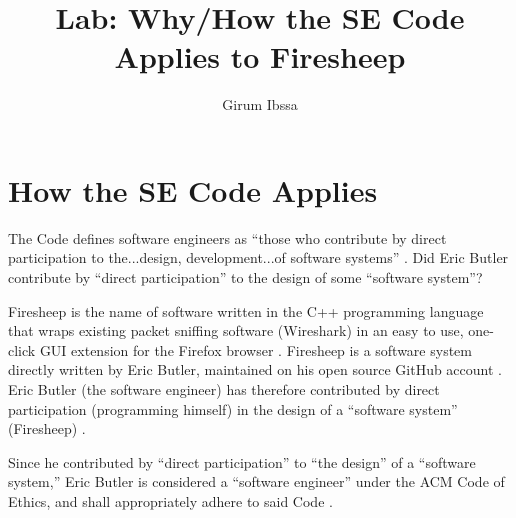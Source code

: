\documentclass[11pt]{article}
\begin{document}
\twocolumn
\author{Girum Ibssa}
\title{Lab: Why/How the SE Code Applies to Firesheep}
\maketitle


\section{How the SE Code Applies}
The Code defines software engineers as ``those who contribute by direct participation to the...design, development...of software systems'' \cite{se-code}. Did Eric Butler contribute by ``direct participation'' to the design of some ``software system''?

Firesheep is the name of software written in the C++ programming language that wraps existing packet sniffing software (Wireshark) in an easy to use, one-click GUI extension for the Firefox browser \cite{firesheep}. Firesheep is a software system directly written by Eric Butler, maintained on his open source GitHub account \cite{firesheep-source}. Eric Butler (the software engineer) has therefore contributed by direct participation (programming himself) in the design of a ``software system'' (Firesheep) \cite{firesheep}.

Since he contributed by ``direct participation'' to ``the design'' of a ``software system,'' Eric Butler is considered a ``software engineer'' under the ACM Code of Ethics, and shall appropriately adhere to said Code \cite{se-code}.



\onecolumn

\end{document}
